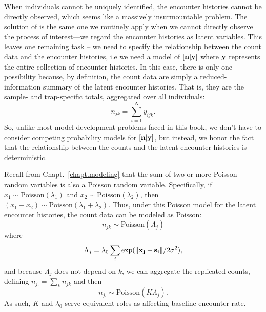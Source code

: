 When individuals cannot be uniquely identified, the encounter histories cannot
be directly observed, which seems like a massively insurmountable
problem. The solution of \citet{chandler_royal:2012} is the same one we routinely apply when we
cannot directly observe the process of interest---we regard the
encounter histories as latent variables. This leaves one remaining
task -- we need to specify the relationship between the count data and
the encounter histories, i.e we need a model of $[{\bf n}|{\bf y}]$
where $\bf y$ represents the entire collection of encounter
histories. In this case, there is only one possibility because, by
definition, the count data are simply a
reduced-information summary of the latent encounter histories. That
is, they are the sample- and trap-specific totals, aggregated over all
individuals:
\begin{equation}
n_{jk} = \sum_{i=1}^{N} y_{ijk}.
\label{chapt.unmarked.eq.ny}
\end{equation}
So, unlike most model-development problems faced in this book, we
don't have to consider competing probability models for
$[{\bf n}|{\bf y}]$, but instead, we honor the fact that the
relationship between the counts and the latent encounter histories is
deterministic. %


Recall from Chapt.~\ref{chapt.modeling} that the sum of two or more
Poisson random variables is also a Poisson random variable.
Specifically,
if $x_1 \sim \text{Poisson}(\lambda_1)$ and
$x_2 \sim \text{Poisson}(\lambda_2)$, then $(x_1+x_2) \sim
\text{Poisson}(\lambda_1 + \lambda_2)$. Thus,
under this Poisson model for the latent encounter histories,
the count data can be modeled as Poisson:
\begin{equation}
n_{jk} \sim \mbox{Poisson}( \Lambda_{j} )
\label{eq:nagg}
\end{equation}
where
\[
 \Lambda_{j} = \lambda_0 \sum_{i} \exp(\| {\bf x_j - s_i} \| / 2\sigma^2),
\]
and because $\Lambda_j$ does not depend on $k$, we can
aggregate the replicated counts, defining
$n_{j.} = \sum_{k} n_{jk}$ and then
\[
 n_{j.} \sim \mbox{Poisson}( K \Lambda_{j} ).
\]
As such, $K$ and $\lambda_{0}$ serve equivalent roles as affecting
baseline encounter rate.


